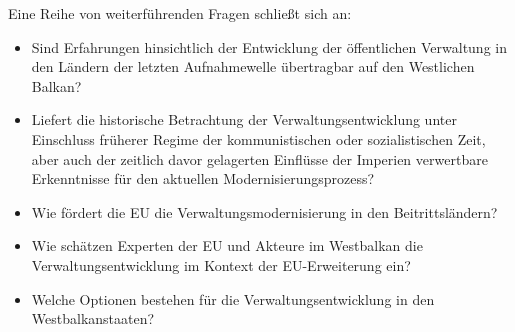 Eine Reihe von weiterführenden Fragen schließt sich an:
\begin{itemize} \itemsep1pt \parskip0pt 
\item Sind Erfahrungen hinsichtlich der Entwicklung der öffentlichen Verwaltung in den Ländern der letzten Aufnahmewelle übertragbar auf den Westlichen Balkan?
\item  Liefert die historische Betrachtung der Verwaltungsentwicklung unter Einschluss früherer Regime der kommunistischen oder sozialistischen Zeit, aber auch der zeitlich davor gelagerten Einflüsse der Imperien verwertbare Erkenntnisse für den aktuellen Modernisierungsprozess?
\item Wie fördert die EU die Verwaltungsmodernisierung in den Beitrittsländern?
\item Wie schätzen Experten der EU und Akteure im Westbalkan die Verwaltungsentwicklung im Kontext der EU-Erweiterung ein?
\item Welche Optionen bestehen für die Verwaltungsentwicklung in den Westbalkanstaaten?
\end{itemize}
